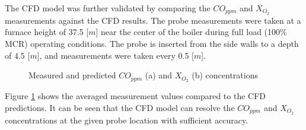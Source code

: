 \documentclass[11pt,cleanfoot]{asme2ej}
\begin{document}
The CFD model was further validated by comparing the $CO_{ppm}$ and $X_{O_{2}}$ measurements against the CFD results. The probe measurements were taken at a furnace height of 37.5 [$m$] near the center of the boiler during full load (100\% MCR) operating conditions. The probe is inserted from the side walls to a depth of 4.5 [$m$], and measurements were taken every 0.5 [$m$].
\begin{figure}[h!]
\centering
{}
\hspace{5mm}
\caption{Measured and predicted $CO_{ppm}$ (a) and $X_{O_{2}}$ (b) concentrations}
\label{fig_probe_valid}
\end{figure}

Figure \ref{fig_probe_valid} shows the averaged measurement values compared to the CFD predictions. It can be seen that the CFD model can resolve the $CO_{ppm}$ and $X_{O_{2}}$ concentrations at the given probe location with sufficient accuracy.
\end{document}
